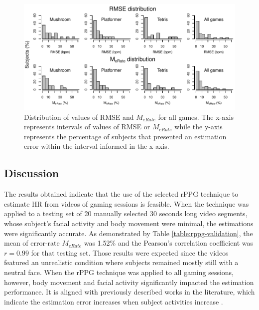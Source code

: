 \begin{figure}
\centering
\includegraphics[width=\textwidth]{figures/hist-rmse-mrate.pdf}
\caption{Distribution of values of RMSE and $M_{eRate}$ for all games. The x-axis represents intervals of values of RMSE or $M_{eRate}$ while the y-axis represents the percentage of subjects that presented an estimation error within the interval informed in the x-axis.}
\label{fig:chart-hists}
\end{figure}

\subsection{Discussion}
The results obtained indicate that the use of the selected rPPG technique to estimate HR from videos of gaming sessions is feasible. When the technique was applied to a testing set of 20 manually selected 30 seconds long video segments, whose subject's facial activity and body movement were minimal, the estimations were significantly accurate. As demonstrated by Table \ref{table:rppg-validation}, the mean of error-rate $M_{eRate}$ was 1.52\% and the Pearson's correlation coefficient was $r = 0.99$ for that testing set. Those results were expected since the videos featured an unrealistic condition where subjects remained mostly still with a neutral face. When the rPPG technique was applied to all gaming sessions, however, body movement and facial activity significantly impacted the estimation performance. It is aligned with previously described works in the literature, which indicate the estimation error increases when subject activities increase \parencite{Wang_2016novel}.

